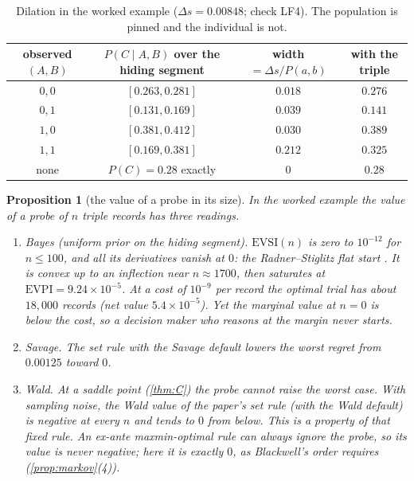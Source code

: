 \documentclass[11pt]{article}
\newtheorem{proposition}{Proposition}\newtheorem{corollary}{Corollary}\newtheorem{lemma}{Lemma}
\theoremstyle{definition}\newtheorem{definition}{Definition}\newtheorem{remark}{Remark}
\begin{document}
\begin{table}[!htbp]\centering\small
\begin{tabular}{cccc}\toprule
observed $(A,B)$ & $P(C\mid A,B)$ over the hiding segment & width $=\Delta s/P(a,b)$ & with the triple\\\midrule
$0,0$ & $[0.263, 0.281]$ & $0.018$ & $0.276$\\
$0,1$ & $[0.131, 0.169]$ & $0.039$ & $0.141$\\
$1,0$ & $[0.381, 0.412]$ & $0.030$ & $0.389$\\
$1,1$ & $[0.169, 0.381]$ & $0.212$ & $0.325$\\\midrule
none & $P(C)=0.28$ exactly & $0$ & $0.28$\\\bottomrule
\end{tabular}
\caption{Dilation in the worked example ($\Delta s=0.00848$; check LF4). The population is pinned and the individual is not.}\label{tab:dilation}
\end{table}

\begin{proposition}[the value of a probe in its size]\label{prop:voisize}
In the worked example the value of a probe of $n$ triple records has three readings.
\begin{enumerate}
\item[(1)] \emph{Bayes} (uniform prior on the hiding segment). $\mathrm{EVSI}(n)$ is zero to $10^{-12}$ for $n\le100$, and all its
  derivatives vanish at $0$: the Radner--Stiglitz flat start \cite{RadnerStiglitz1984}. It is convex up to an inflection near
  $n\approx1700$, then saturates at $\mathrm{EVPI}=9.24\times10^{-5}$. At a cost of $10^{-9}$ per record the optimal trial has about $18{,}000$
  records (net value $5.4\times10^{-5}$). Yet the marginal value at $n=0$ is below the cost, so a decision maker who reasons at the
  margin never starts.
\item[(2)] \emph{Savage.} The set rule with the Savage default lowers the worst regret from $0.00125$ toward $0$.
\item[(3)] \emph{Wald.} At a saddle point (\cref{thm:C}) the probe cannot raise the worst case. With sampling noise, the Wald value of
  the paper's set rule (with the Wald default) is \emph{negative} at every $n$ and tends to $0$ from below. This is a property of that
  fixed rule. An ex-ante maxmin-optimal rule can always ignore the probe, so its value is never negative; here it is exactly $0$, as
  Blackwell's order requires (\cref{prop:markov}(4)).
\end{enumerate}
\end{proposition}
\end{document}
